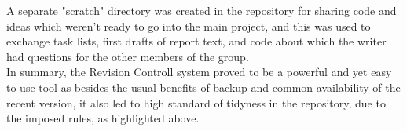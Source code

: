 A separate "scratch" directory was created in the repository for sharing code and ideas which weren't ready to go into the main project, and this was used to exchange task lists, first drafts of report text, and code about which the writer had questions for the other members of the group.\\

In summary, the Revision Controll system proved to be a powerful and yet easy to use tool as besides the usual benefits of backup and common availability of the recent version, it also led to high standard of tidyness in the repository, due to the imposed rules, as highlighted above.
